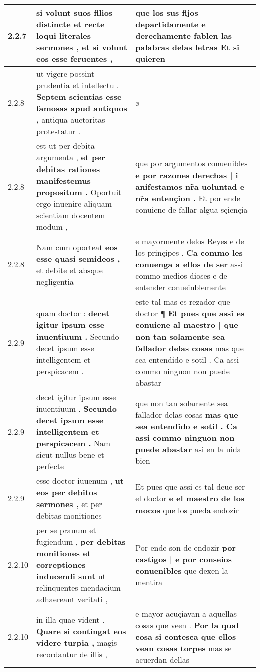 \begin{tabular}{|p{1cm}|p{6.5cm}|p{6.5cm}|}
2.2.7 & si volunt suos filios distincte \textbf{ et recte loqui literales sermones , } et si volunt eos esse feruentes , & que los sus fijos departidamente \textbf{ e derechamente fablen las palabras delas letras } Et si quieren \\\hline
2.2.8 & ut vigere possint prudentia et intellectu . \textbf{ Septem scientias esse famosas apud antiquos , } antiqua auctoritas protestatur . & ø \\\hline
2.2.8 & est ut per debita argumenta , \textbf{ et per debitas rationes manifestemus propositum . } Oportuit ergo inuenire aliquam scientiam docentem modum , & que por argumentos conuenibles \textbf{ e por razones derechas | i anifestamos nr̃a uoluntad e nr̃a entençion . } Et por ende conuiene de fallar algua sçiençia \\\hline
2.2.8 & Nam cum oporteat \textbf{ eos esse quasi semideos , } et debite et absque negligentia & e mayormente delos Reyes e de los prinçipes . \textbf{ Ca commo les conuenga a ellos de ser } assi commo medios dioses e de entender conueinblemente \\\hline
2.2.9 & quam doctor : \textbf{ decet igitur ipsum esse inuentiuum . } Secundo decet ipsum esse intelligentem et perspicacem . & este tal mas es rezador que doctor ¶ \textbf{ Et pues que assi es conuiene al maestro | que non tan solamente sea fallador delas cosas } mas que sea entendido e sotil . Ca assi commo ninguon non puede abastar \\\hline
2.2.9 & decet igitur ipsum esse inuentiuum . \textbf{ Secundo decet ipsum esse intelligentem et perspicacem . } Nam sicut nullus bene et perfecte & que non tan solamente sea fallador delas cosas \textbf{ mas que sea entendido e sotil . Ca assi commo ninguon non puede abastar } asi en la uida bien \\\hline
2.2.9 & esse doctor iuuenum , \textbf{ ut eos per debitos sermones , } et per debitas monitiones & Et pues que assi es tal deue ser el doctor \textbf{ e el maestro de los mocos } que los pueda endozir \\\hline
2.2.10 & per se prauum et fugiendum , \textbf{ per debitas monitiones et correptiones inducendi sunt } ut relinquentes mendacium adhaereant veritati , & Por ende son de endozir \textbf{ por castigos | e por conseios conuenibles } que dexen la mentira \\\hline
2.2.10 & in illa quae vident . \textbf{ Quare si contingat eos videre turpia , } magis recordantur de illis , & e mayor acuçiavan a aquellas cosas que veen . \textbf{ Por la qual cosa si contesca que ellos vean cosas torpes } mas se acuerdan dellas \\\hline

\end{tabular}
